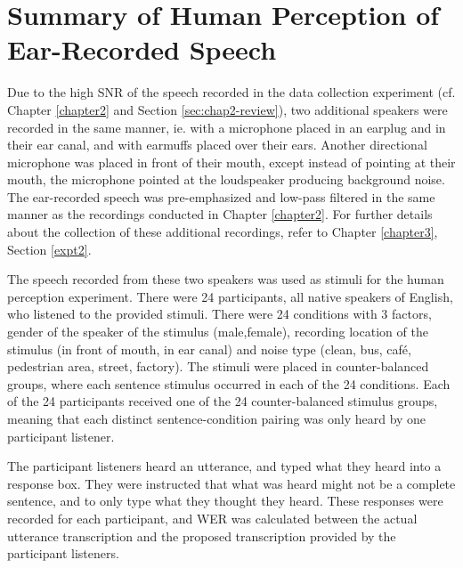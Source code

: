 \section{Summary of Human Perception of Ear-Recorded Speech}\label{sec:chap3-review}

Due to the high SNR of the speech recorded in the data collection experiment (cf. Chapter \ref{chapter2} and Section \ref{sec:chap2-review}), two additional speakers were recorded in the same manner, ie. with a microphone placed in an earplug and in their ear canal, and with earmuffs placed over their ears.  Another directional microphone was placed in front of their mouth, except instead of pointing at their mouth, the microphone pointed at the loudspeaker producing background noise. The ear-recorded speech was pre-emphasized and low-pass filtered in the same manner as the recordings conducted in Chapter \ref{chapter2}. For further details about the collection of these additional recordings, refer to Chapter \ref{chapter3}, Section \ref{expt2}.

The speech recorded from these two speakers was used as stimuli for the human perception experiment.  There were 24 participants, all native speakers of English, who listened to the provided stimuli.  There were 24 conditions with 3 factors, gender of the speaker of the stimulus (male,female), recording location of the stimulus (in front of mouth, in ear canal) and noise type (clean, bus, caf\'{e}, pedestrian area, street, factory).  The stimuli were placed in counter-balanced groups, where each sentence stimulus occurred in each of the 24 conditions.  Each of the 24 participants received one of the 24 counter-balanced stimulus groups, meaning that each distinct sentence-condition pairing was only heard by one participant listener.

The participant listeners heard an utterance, and typed what they heard into a response box.  They were instructed that what was heard might not be a complete sentence, and to only type what they thought they heard.  These responses were recorded for each participant, and WER was calculated between the actual utterance transcription and the proposed transcription provided by the participant listeners.

